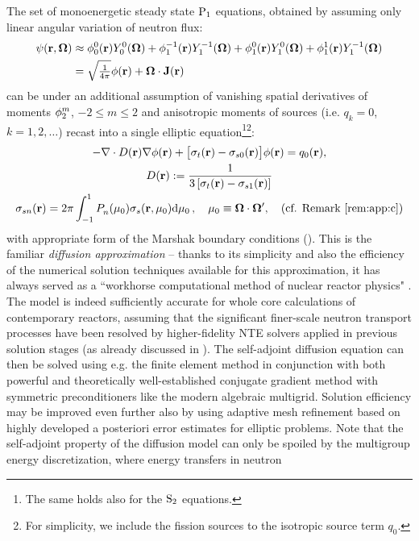 The set of monoenergetic steady state $\PN[1]$ equations, obtained by assuming only linear angular variation of neutron
flux:
$$
\begin{aligned}
	\psi(\br,\bomega) &\approx \angmom{0}{0}(\br)\Y{0}{0}(\bomega) + \angmom{1}{-1}(\br)\Y{1}{-1}(\bomega)
	+ \angmom{1}{0}(\br)\Y{1}{0}(\bomega) + \angmom{1}{1}(\br)\Y{1}{-1}(\bomega)\\
	&= \sqrt{\tfrac{1}{4\pi}}\phi(\br) + \bomega\cdot \bJ(\br)
\end{aligned}
$$
can be under an additional assumption of vanishing spatial derivatives of moments $\angmom{2}{m}$, $-2 \leq m \leq
2$ and anisotropic moments of sources (i.e. $q_{k} = 0$, $k = 1,2,\ldots$)  
recast into a single elliptic equation\footnote{The same holds also for the $\SN[2]$ equations.}\footnote{For
simplicity, we include the fission sources to the isotropic source term $q_0$.}:
$$
\begin{gathered}
	-\nabla\cdot D(\br) \nabla\phi(\br) + \bigl[\sigma_t(\br) - \sigma_{s0}(\br)\bigr]\phi(\br) = q_0(\br),\\
	D(\br) := \frac{1}{3\left[\sigma_t(\br) - \sigma_{s1}(\br)\right]}\\
	\sigma_{sn}(\br) = 2\pi \muint[_0]{\P{n}{}(\mu_0)\sigma_s(\br,\mu_0)},\quad \mu_0 \equiv \bomega\cdot\bomega',\quad
	\mbox{(cf.
	Remark
	\ref{rem:app:c})}
\end{gathered}	
$$
with appropriate form of the Marshak boundary conditions (\cite{Stacey1,Reuss1}).
This is the familiar \textit{diffusion approximation} -- thanks to its simplicity and also the efficiency of the numerical solution techniques available for this approximation, it has always served as a ``workhorse computational method of nuclear reactor physics" \cite[p. 43]{Stacey1}. The model is indeed
sufficiently accurate for whole core calculations of contemporary reactors, assuming that the significant finer-scale
neutron transport processes have been resolved by higher-fidelity NTE solvers applied in previous solution stages (as
already discussed in ).
The self-adjoint diffusion equation can then be solved using e.g. the finite element method in conjunction with both
powerful and theoretically well-established conjugate gradient method with symmetric preconditioners like the modern
algebraic multigrid. Solution efficiency may be improved even further also by using adaptive mesh refinement based on
highly developed a posteriori error estimates for elliptic problems. Note that the self-adjoint property of the
diffusion model can only be spoiled by the multigroup energy discretization, where energy transfers in neutron
